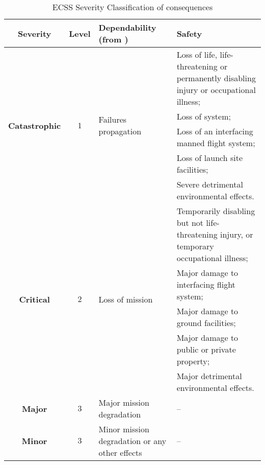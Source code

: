 \begin{table}[!ht]
\centering
\noindent \begin{tabular}{|c|c|m{4cm}|m{5cm}|}\hline
\textbf{Severity} & \textbf{Level} & \textbf{Dependability (from \cite{ecss-q-st-30c})} & \textbf{Safety}\\\hline\hline
\multirow{5}{*}{\textbf{Catastrophic}} & \multirow{5}{*}{$1$} & \multirow{5}{*}{Failures propagation} & 
Loss of life, life-threatening or permanently disabling injury or occupational illness;\\\cline{4-4}
& & & Loss of system;  \\ \cline{4-4}
& & & Loss of an interfacing manned flight system; \\ \cline{4-4}
& & & Loss of launch site facilities;  \\ \cline{4-4}
& & & Severe detrimental environmental effects.  \\\hline\hline
\multirow{5}{*}{\textbf{Critical}} & \multirow{5}{*}{$2$} & \multirow{5}{*}{Loss of mission} & 
Temporarily disabling but not life-threatening injury, or temporary occupational illness;\\\cline{4-4}
& & & Major damage to interfacing flight system;  \\ \cline{4-4}
& & & Major damage to ground facilities; \\ \cline{4-4}
& & & Major damage to public or private property;  \\ \cline{4-4}
& & & Major detrimental environmental effects.  \\\hline\hline
\textbf{Major} & $3$ & Major mission degradation & --\\\hline\hline
\textbf{Minor} & $3$ & Minor mission degradation or any other effects & --\\\hline
\end{tabular}
\caption{ECSS Severity Classification of consequences}\label{tab:severity}
\end{table}

